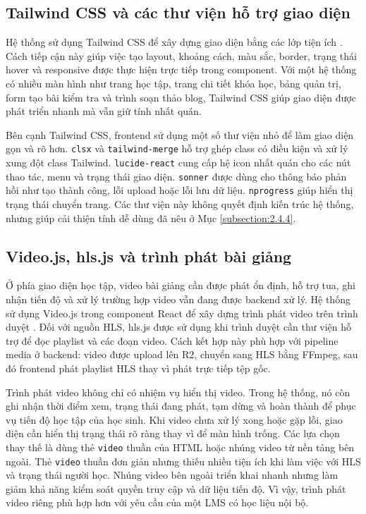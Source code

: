 \documentclass[../DoAn.tex]{subfiles}
\begin{document}
\subsection{Tailwind CSS và các thư viện hỗ trợ giao diện}
\label{subsection:3.2.4}

Hệ thống sử dụng Tailwind CSS để xây dựng giao diện bằng các lớp tiện ích \cite{tailwind_docs}. Cách tiếp cận này giúp việc tạo layout, khoảng cách, màu sắc, border, trạng thái hover và responsive được thực hiện trực tiếp trong component. Với một hệ thống có nhiều màn hình như trang học tập, trang chi tiết khóa học, bảng quản trị, form tạo bài kiểm tra và trình soạn thảo blog, Tailwind CSS giúp giao diện được phát triển nhanh mà vẫn giữ tính nhất quán.

Bên cạnh Tailwind CSS, frontend sử dụng một số thư viện nhỏ để làm giao diện gọn và rõ hơn. \texttt{clsx} và \texttt{tailwind-merge} hỗ trợ ghép class có điều kiện và xử lý xung đột class Tailwind. \texttt{lucide-react} cung cấp hệ icon nhất quán cho các nút thao tác, menu và trạng thái giao diện. \texttt{sonner} được dùng cho thông báo phản hồi như tạo thành công, lỗi upload hoặc lỗi lưu dữ liệu. \texttt{nprogress} giúp hiển thị trạng thái chuyển trang. Các thư viện này không quyết định kiến trúc hệ thống, nhưng giúp cải thiện tính dễ dùng đã nêu ở Mục \ref{subsection:2.4.4}.

\subsection{Video.js, hls.js và trình phát bài giảng}
\label{subsection:3.2.5}

Ở phía giao diện học tập, video bài giảng cần được phát ổn định, hỗ trợ tua, ghi nhận tiến độ và xử lý trường hợp video vẫn đang được backend xử lý. Hệ thống sử dụng Video.js trong component React để xây dựng trình phát video trên trình duyệt \cite{videojs_docs}. Đối với nguồn HLS, hls.js được sử dụng khi trình duyệt cần thư viện hỗ trợ để đọc playlist và các đoạn video. Cách kết hợp này phù hợp với pipeline media ở backend: video được upload lên R2, chuyển sang HLS bằng FFmpeg, sau đó frontend phát playlist HLS thay vì phát trực tiếp tệp gốc.

Trình phát video không chỉ có nhiệm vụ hiển thị video. Trong hệ thống, nó còn ghi nhận thời điểm xem, trạng thái đang phát, tạm dừng và hoàn thành để phục vụ tiến độ học tập của học sinh. Khi video chưa xử lý xong hoặc gặp lỗi, giao diện cần hiển thị trạng thái rõ ràng thay vì để màn hình trống. Các lựa chọn thay thế là dùng thẻ \texttt{video} thuần của HTML hoặc nhúng video từ nền tảng bên ngoài. Thẻ \texttt{video} thuần đơn giản nhưng thiếu nhiều tiện ích khi làm việc với HLS và trạng thái người học. Nhúng video bên ngoài triển khai nhanh nhưng làm giảm khả năng kiểm soát quyền truy cập và dữ liệu tiến độ. Vì vậy, trình phát video riêng phù hợp hơn với yêu cầu của một LMS có học liệu nội bộ.
\end{document}
